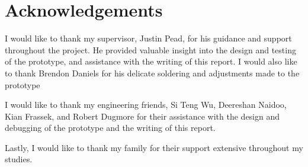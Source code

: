 \chapter*{Acknowledgements}


I would like to thank my supervisor, Justin Pead, for his guidance and support throughout the project. 
He provided valuable insight into the design and testing of the prototype, and assistance with the writing of this report.
I would also like to thank Brendon Daniels for his delicate soldering and adjustments made to the prototype

I would like to thank my engineering friends, Si Teng Wu, Deereshan Naidoo, Kian Frassek, and Robert Dugmore for their assistance with the design and debugging of the prototype and the writing of this report.

Lastly, I would like to thank my family for their support extensive throughout my studies.